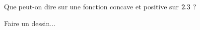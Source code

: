 \begin{exercice}
    Que peut-on dire sur une fonction concave et positive sur $2.3$ ?
\end{exercice}

\begin{elem_sol}
    Faire un dessin...
\end{elem_sol}